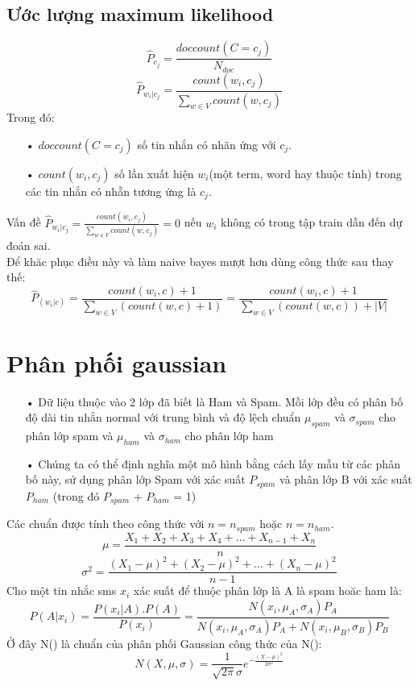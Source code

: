 \documentclass[a4paper,11pt]{report}
\begin{document}
\subsection{Ước lượng maximum likelihood}
\begin{displaymath}
\displaystyle
\hat{P}_{c_j} = \frac{doccount( C = c_j)}{N_{doc}}
\end{displaymath}
\begin{displaymath}
\displaystyle
\hat{P}_{w_i|c_j} = \frac{count(w_i,c_j)}{\sum_{w\in V} count(w,c_j)}
\end{displaymath}
Trong đó:
\begin{itemize}
\item[•] $doccount(C = c_j)$ số tin nhắn có nhãn ứng với $c_j$.
\item[•] $count(w_i,c_j)$ số lần xuất hiện $w_i$(một term, word hay thuộc tính) trong các tin nhắn có nhẵn tương ứng là $c_j$.
\end{itemize}
Vấn đề $\hat{P}_{w_i|c_j} = \frac{count(w_i,c_j)}{\sum_{w\in V} count(w,c_j)} = 0$ nếu $w_i$ không có trong tập train dẫn đến dự đoán sai. \\
Để khăc phục điều này và làm naive bayes mượt hơn dùng công thức sau thay thế:
\begin{displaymath}
\displaystyle
\hat{P}_{(w_i|c)} = \frac{count(w_i,c) + 1}{\sum_{w\in V}(count(w,c) + 1)} = \frac{count(w_i,c) + 1}{\sum_{w\in V}(count(w,c)) + |V|}
\end{displaymath}
\section{Phân phối gaussian}
\begin{itemize}
\item[•] Dữ liệu thuộc vào 2 lớp đã biết là Ham và Spam. Mỗi lớp đều có phân bố độ dài tin nhắn normal với trung bình và độ lệch chuẩn $\mu_{spam}$ và $\sigma_{spam}$ cho phân lớp spam và $\mu_{ham}$ và $\sigma_{ham}$ cho phân lớp ham
\item[•] Chúng ta có thể định nghĩa một mô hình bằng cách lấy mẫu từ các phân bố này, sử dụng phân lớp Spam với xác suất $P_{spam}$ và phân lớp B với xác suất $P_{ham}$ (trong đó $P_{spam}$ + $P_{ham}$ = 1)
\end{itemize}
Các chuẩn được tính theo công thức với $n = n_{spam}$ hoặc $n = n_{ham}$.
\begin{displaymath}
\mu = \frac{X_1 + X_2 + X_3 + X_4 + \ldots + X_{n-1} +X_n}{n}
\end{displaymath}
\begin{displaymath}
\sigma^2 = \frac{(X_1 - \mu)^2 + (X_2 - \mu)^2 + \ldots + (X_n - \mu)^2}{n - 1}
\end{displaymath}
Cho một tin nhắc sms $x_i$ xác suất để thuộc phân lớp là A là spam hoăc ham là:
\begin{displaymath}
\displaystyle
P(A|x_i) = \frac{P(x_i|A).P(A)}{P(x_i)} = \frac{N(x_i,\mu_A ,\sigma_A )P_A}{N(x_i,\mu_A ,\sigma_A )P_A + N(x_i,\mu_B ,\sigma_B )P_B}
\end{displaymath}
Ở đây N() là chuẩn của phân phối Gaussian công thức của N():
\begin{displaymath}
N(X,\mu ,\sigma ) = \frac{1}{\sqrt{2\pi}\sigma}e^{-\frac{(X - \mu)^2}{2\sigma^2}}
\end{displaymath}
\end{document}
